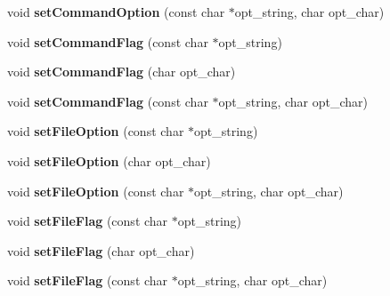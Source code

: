 \begin{DoxyCompactItemize}
\item 
void {\bfseries set\+Command\+Option} (const char $\ast$opt\+\_\+string, char opt\+\_\+char)\hypertarget{class_any_option_a232adbe285778b7b1745ebb419bfbced}{}\label{class_any_option_a232adbe285778b7b1745ebb419bfbced}

\item 
void {\bfseries set\+Command\+Flag} (const char $\ast$opt\+\_\+string)\hypertarget{class_any_option_ab84fbc729395adf0f0989c578a388934}{}\label{class_any_option_ab84fbc729395adf0f0989c578a388934}

\item 
void {\bfseries set\+Command\+Flag} (char opt\+\_\+char)\hypertarget{class_any_option_a226781e167bfa77a3c57e7207a0406b9}{}\label{class_any_option_a226781e167bfa77a3c57e7207a0406b9}

\item 
void {\bfseries set\+Command\+Flag} (const char $\ast$opt\+\_\+string, char opt\+\_\+char)\hypertarget{class_any_option_ad7720617bda6fb5519d195989c8605f2}{}\label{class_any_option_ad7720617bda6fb5519d195989c8605f2}

\item 
void {\bfseries set\+File\+Option} (const char $\ast$opt\+\_\+string)\hypertarget{class_any_option_a4eeaaf6a433ae7d0724243581436914b}{}\label{class_any_option_a4eeaaf6a433ae7d0724243581436914b}

\item 
void {\bfseries set\+File\+Option} (char opt\+\_\+char)\hypertarget{class_any_option_a700d49a1544d37247d9a29bf89f7602b}{}\label{class_any_option_a700d49a1544d37247d9a29bf89f7602b}

\item 
void {\bfseries set\+File\+Option} (const char $\ast$opt\+\_\+string, char opt\+\_\+char)\hypertarget{class_any_option_a0f0790f91a6bbdba445e8d613c4b1e2d}{}\label{class_any_option_a0f0790f91a6bbdba445e8d613c4b1e2d}

\item 
void {\bfseries set\+File\+Flag} (const char $\ast$opt\+\_\+string)\hypertarget{class_any_option_a58332626754ef69f750f2583f7b72a72}{}\label{class_any_option_a58332626754ef69f750f2583f7b72a72}

\item 
void {\bfseries set\+File\+Flag} (char opt\+\_\+char)\hypertarget{class_any_option_a19dad4072d02832b2d86b20f6c11c117}{}\label{class_any_option_a19dad4072d02832b2d86b20f6c11c117}

\item 
void {\bfseries set\+File\+Flag} (const char $\ast$opt\+\_\+string, char opt\+\_\+char)\hypertarget{class_any_option_a8fa052e644d8b04b7bd95bda48c16cf8}{}\label{class_any_option_a8fa052e644d8b04b7bd95bda48c16cf8}


\end{DoxyCompactItemize}
